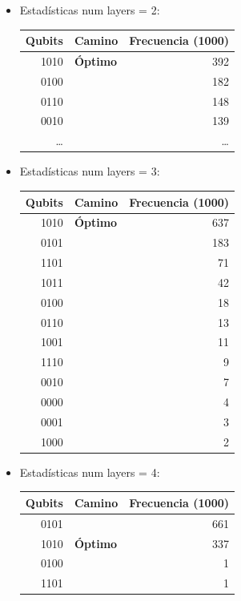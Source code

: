 \documentclass[letterpaper]{article}
\begin{document}
\begin{itemize}
\item Estadísticas num layers = 2:
\begin{center}
\begin{tabular}{|r|l|r|}
\hline
\textbf{Qubits} & \textbf{Camino} & \textbf{Frecuencia} (1000)\\
\hline
1010 & \textbf{Óptimo} & 392\\
0100 &  & 182\\
0110 &  & 148\\
0010 &  & 139\\
\ldots{} &  & \ldots{}\\
\hline
\end{tabular}
\end{center}

\item Estadísticas num layers = 3:
\begin{center}
\begin{tabular}{|r|l|r|}
\hline
\textbf{Qubits} & \textbf{Camino} & \textbf{Frecuencia} (1000)\\
\hline
1010 & \textbf{Óptimo} & 637\\
0101 &  & 183\\
1101 &  & 71\\
1011 &  & 42\\
0100 &  & 18\\
0110 &  & 13\\
1001 &  & 11\\
1110 &  & 9\\
0010 &  & 7\\
0000 &  & 4\\
0001 &  & 3\\
1000 &  & 2\\
\hline
\end{tabular}
\end{center}

\item Estadísticas num layers = 4:
\begin{center}
\begin{tabular}{|r|l|r|}
\hline
\textbf{Qubits} & \textbf{Camino} & \textbf{Frecuencia} (1000)\\
\hline
0101 &  & 661\\
1010 & \textbf{Óptimo} & 337\\
0100 &  & 1\\
1101 &  & 1\\
\hline
\end{tabular}
\end{center}


\end{itemize}
\end{document}
